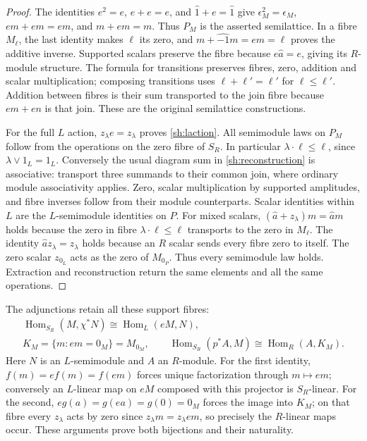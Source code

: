 \documentclass[11pt,a4paper]{article}
\theoremstyle{definition}\newtheorem{definition}[theorem]{Definition}
\providecommand{\Hom}{\operatorname{Hom}}
\begin{document}
\begin{proof}
The identities $e^2=e$, $e+e=e$, and $\widehat1+e=\widehat1$
give $\epsilon_M^2=\epsilon_M$,
$em+em=em$, and $m+em=m$. Thus $P_M$ is the asserted
semilattice. In a fibre $M_\ell$, the last identity makes $\ell$
its zero, and $m+\widehat{-1}m=em=\ell$ proves the additive
inverse. Supported scalars preserve the fibre because
$e\widehat a=e$, giving its $R$-module structure. The formula
for transitions preserves fibres, zero, addition and scalar
multiplication; composing transitions uses
$\ell+\ell'=\ell'$ for $\ell\le\ell'$. Addition between fibres
is their sum transported to the join fibre because $em+en$
is that join. These are the original semilattice constructions.

For the full $L$ action, $z_\lambda e=z_\lambda$ proves
\eqref{sh:laction}. All semimodule laws on $P_M$ follow from
the operations on the zero fibre of $S_R$. In particular
$\lambda\cdot\ell\le\ell$, since $\lambda\vee1_L=1_L$.
Conversely the usual diagram sum in \eqref{sh:reconstruction}
is associative: transport three summands to their common join,
where ordinary module associativity applies. Zero, scalar
multiplication by supported amplitudes, and fibre inverses follow
from their module counterparts. Scalar identities within $L$ are
the $L$-semimodule identities on $P$. For mixed scalars,
$(\widehat a+z_\lambda)m=\widehat a m$ holds because the zero
in fibre $\lambda\cdot\ell\le\ell$ transports to the zero in
$M_\ell$. The identity $\widehat a z_\lambda=z_\lambda$
holds because an $R$ scalar sends every fibre zero to itself.
The zero scalar $z_{0_L}$ acts as the zero of $M_{0_P}$.
Thus every semimodule law holds. Extraction and reconstruction
return the same elements and all the same operations.
\end{proof}

The adjunctions retain all these support fibres:
\begin{equation}\tag{SH14}\label{sh:adjunctions}
 \begin{gathered}
 \Hom_{S_R}(M,\chi^*N)\cong\Hom_L(eM,N),\\
 K_M=\{m:em=0_M\}=M_{0_M},\qquad
 \Hom_{S_R}(p^*A,M)\cong\Hom_R(A,K_M).
 \end{gathered}
\end{equation}
Here $N$ is an $L$-semimodule and $A$ an $R$-module.
For the first identity, $f(m)=ef(m)=f(em)$ forces unique
factorization through $m\mapsto em$; conversely an $L$-linear
map on $eM$ composed with this projector is $S_R$-linear.
For the second, $eg(a)=g(ea)=g(0)=0_M$ forces the image into
$K_M$; on that fibre every $z_\lambda$ acts by zero since
$z_\lambda m=z_\lambda em$, so precisely the $R$-linear
maps occur. These arguments prove both bijections and their
naturality.
\end{document}
